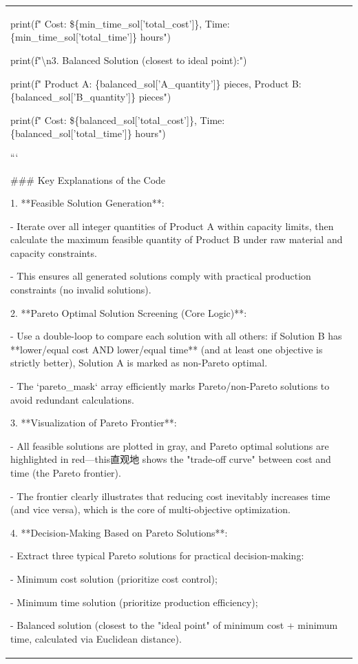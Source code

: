 \begin{longtable}[]{@{}
  >{\raggedright\arraybackslash}p{}@{}}
print(f" Cost: \$\{min\_time\_sol{[}'total\_cost'{]}\}, Time:
\{min\_time\_sol{[}'total\_time'{]}\} hours")

print(f"\textbackslash n3. Balanced Solution (closest to ideal point):")

print(f" Product A: \{balanced\_sol{[}'A\_quantity'{]}\} pieces, Product
B: \{balanced\_sol{[}'B\_quantity'{]}\} pieces")

print(f" Cost: \$\{balanced\_sol{[}'total\_cost'{]}\}, Time:
\{balanced\_sol{[}'total\_time'{]}\} hours")

```

\#\#\# Key Explanations of the Code

1. **Feasible Solution Generation**:

- Iterate over all integer quantities of Product A within capacity
limits, then calculate the maximum feasible quantity of Product B under
raw material and capacity constraints.

- This ensures all generated solutions comply with practical production
constraints (no invalid solutions).

2. **Pareto Optimal Solution Screening (Core Logic)**:

- Use a double-loop to compare each solution with all others: if
Solution B has **lower/equal cost AND lower/equal time** (and at least
one objective is strictly better), Solution A is marked as non-Pareto
optimal.

- The `pareto\_mask` array efficiently marks Pareto/non-Pareto solutions
to avoid redundant calculations.

3. **Visualization of Pareto Frontier**:

- All feasible solutions are plotted in gray, and Pareto optimal
solutions are highlighted in red---this直观地 shows the "trade-off
curve" between cost and time (the Pareto frontier).

- The frontier clearly illustrates that reducing cost inevitably
increases time (and vice versa), which is the core of multi-objective
optimization.

4. **Decision-Making Based on Pareto Solutions**:

- Extract three typical Pareto solutions for practical decision-making:

- Minimum cost solution (prioritize cost control);

- Minimum time solution (prioritize production efficiency);

- Balanced solution (closest to the "ideal point" of minimum cost +
minimum time, calculated via Euclidean distance).


\end{longtable}
